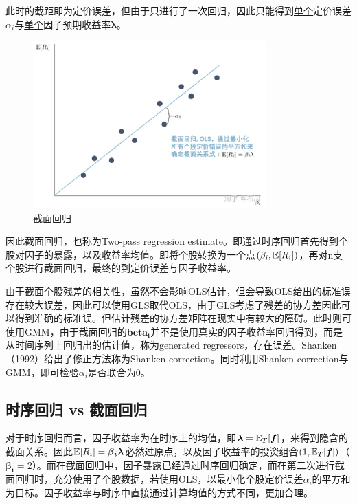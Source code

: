 \documentclass[11pt]{article}
\begin{document}
此时的截距即为定价误差，但由于只进行了一次回归，因此只能得到\uline{单个}定价误差$\alpha_i$与\uline{单个}因子预期收益率$\bm{\lambda}$。

\begin{figure}[H]
    \centering
    \includegraphics[width=0.8\textwidth]{fig/cs_reg.jpg}
    \caption{截面回归}
    \label{fig：cs_reg}
\end{figure}

因此截面回归，也称为Two-pass regression estimate。即通过时序回归首先得到个股对因子的暴露，以及收益率均值。即将个股转换为一个点$(\beta_i,\mathbb{E}[R_i])$，再对n支个股进行截面回归，最终的到定价误差与因子收益率。

由于截面个股残差的相关性，虽然不会影响OLS估计，但会导致OLS给出的标准误存在较大误差，因此可以使用GLS取代OLS，由于GLS考虑了残差的协方差因此可以得到准确的标准误。但估计残差的协方差矩阵在现实中有较大的障碍。此时则可使用GMM，由于截面回归的$\bm{beta_i}$并不是使用真实的因子收益率回归得到，而是从时间序列上回归出的估计值，称为generated regressors，存在误差。Shanken（1992）给出了修正方法称为Shanken correction。同时利用Shanken correction与GMM，即可检验$\alpha_i$是否联合为0。

\subsection{时序回归 vs 截面回归}

对于时序回归而言，因子收益率为在时序上的均值，即$\bm{\lambda} = \mathbb{E}_T[\bm{f}]$，来得到隐含的截面关系。因此$\mathbb{E}[R_i] = \bm{\beta_i \lambda}$必然过原点，以及因子收益率的投资组合$(1,\mathbb{E}_T[\bm{f}])$（$\bm{\beta_i}=2$）。而在截面回归中，因子暴露已经通过时序回归确定，而在第二次进行截面回归时，充分使用了个股数据，若使用OLS，以最小化个股定价误差$\alpha_i$的平方和为目标。因子收益率与时序中直接通过计算均值的方式不同，更加合理。
\end{document}
